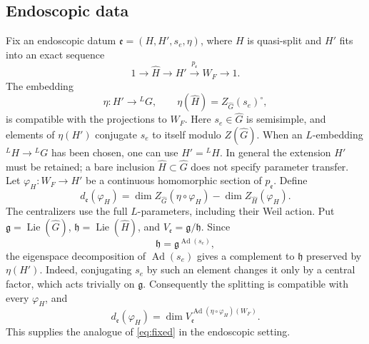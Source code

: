 \documentclass[11pt,a4paper]{amsart}
\DeclareMathOperator{\Lie}{Lie}
\DeclareMathOperator{\Ad}{Ad}
\theoremstyle{definition}
\theoremstyle{remark}
\begin{document}
\subsection{Endoscopic data}
Fix an endoscopic datum
$\mathfrak e=(H,H',s_e,\eta)$, where $H$ is
quasi-split and $H'$ fits into an exact sequence
$$
1\longrightarrow\widehat H\longrightarrow H'
\xrightarrow{p_{\mathfrak e}}W_F\longrightarrow1.
$$
The embedding
$$
\eta:H'\longrightarrow{}^LG,
\qquad
\eta(\widehat H)=Z_{\widehat G}(s_e)^\circ,
$$
is compatible with the projections to $W_F$.
Here $s_e\in\widehat G$ is semisimple, and elements of $\eta(H')$ conjugate $s_e$ to itself modulo $Z(\widehat G)$. When an $L$-embedding ${}^LH\to{}^LG$ has been chosen, one can use $H'={}^LH$. In general the extension $H'$ must be retained; a bare inclusion $\widehat H\subset\widehat G$ does not specify parameter transfer.
Let $\varphi_H:W_F\to H'$ be a continuous homomorphic section of $p_{\mathfrak e}$. Define
$$
d_{\mathfrak e}(\varphi_H)
=\dim Z_{\widehat G}(\eta\circ\varphi_H)
 -\dim Z_{\widehat H}(\varphi_H).
$$
The centralizers use the full $L$-parameters, including their Weil action.
Put $\mathfrak g=\Lie(\widehat G)$, $\mathfrak h=\Lie(\widehat H)$, and $V_{\mathfrak e}=\mathfrak g/\mathfrak h$. Since
$$
\mathfrak h=\mathfrak g^{\Ad(s_e)},
$$
the eigenspace decomposition of $\Ad(s_e)$ gives a complement to $\mathfrak h$ preserved by $\eta(H')$. Indeed, conjugating $s_e$ by such an element changes it only by a central factor, which acts trivially on $\mathfrak g$. Consequently the splitting is compatible with every $\varphi_H$, and
\begin{equation}\label{eq:endofixed}
d_{\mathfrak e}(\varphi_H)
=\dim V_{\mathfrak e}^{\Ad(\eta\circ\varphi_H)(W_F)}.
\end{equation}
This supplies the analogue of \eqref{eq:fixed} in the endoscopic setting.
\end{document}
